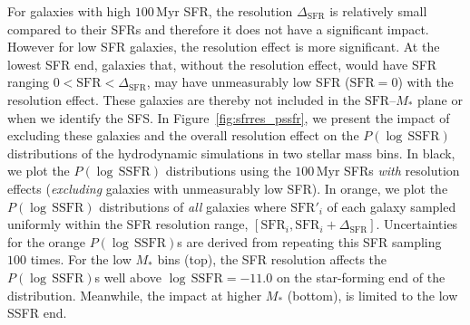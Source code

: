 \documentclass[tighten, preprint]{aastex62}
\begin{document}
For galaxies with high $100\,\mathrm{Myr}$ SFR, the resolution 
$\Delta_\mathrm{SFR}$ is relatively small compared to their SFRs and
therefore it does not have a significant impact. However for low SFR 
galaxies, the resolution effect is more significant. At the lowest SFR 
end, galaxies that, without the resolution effect, would have SFR ranging 
$0 < \mathrm{SFR} < \Delta_\mathrm{SFR}$, may have unmeasurably low SFR 
($\mathrm{SFR}{=}0$) with the resolution effect. These galaxies are thereby 
not included in the $\mathrm{SFR}$--$M_*$ plane or when we identify the SFS. In
Figure~\ref{fig:sfrres_pssfr}, we present the impact of excluding these
galaxies and the overall resolution effect on the $P(\log\,\mathrm{SSFR})$ 
distributions of the hydrodynamic simulations in two stellar mass bins. In 
black, we plot the $P(\log\,\mathrm{SSFR})$ distributions using the 
$100\,\mathrm{Myr}$ SFRs \emph{with} resolution effects
(\emph{excluding} galaxies with unmeasurably low SFR). In orange, we plot the 
$P(\log\,\mathrm{SSFR})$ distributions of \emph{all} galaxies where
$\mathrm{SFR}'_i$ of each galaxy sampled uniformly within the SFR resolution range, 
$[\mathrm{SFR}_i, \mathrm{SFR}_i+\Delta_\mathrm{SFR}]$. Uncertainties 
for the orange $P(\log\,\mathrm{SSFR})$s are derived from repeating this 
SFR sampling $100$ times. For the low $M_*$ bins (top), the SFR resolution 
affects the $P(\log\,\mathrm{SSFR})$s well above $\log\,\mathrm{SSFR}{=}{-}11.0$ 
on the star-forming end of the distribution. Meanwhile, the impact at higher
$M_*$ (bottom), is limited to the low SSFR end. 
\end{document}
